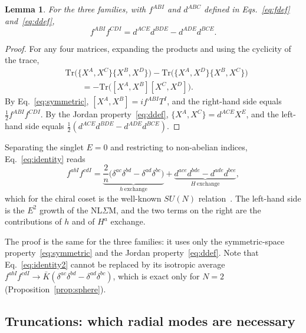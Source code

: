 \documentclass[aps,prd,twocolumn,superscriptaddress,nofootinbib,floatfix]{revtex4-2}
\newtheorem{lemma}{Lemma}
\theoremstyle{remark}
\newcommand{\Tr}{\mathrm{Tr}}
\begin{document}
\begin{lemma}
\label{lem:identity}
For the three families, with $f^{ABI}$ and $d^{ABC}$ defined in Eqs.~\eqref{eq:fdef} and~\eqref{eq:ddef},
\begin{equation}
f^{ABI}f^{CDI}=d^{ACE}d^{BDE}-d^{ADE}d^{BCE}.
\label{eq:identity}
\end{equation}
\end{lemma}
\begin{proof}
For any four matrices, expanding the products and using the cyclicity of the trace,
\begin{equation}
\begin{split}
&\Tr\big(\{X^A,X^C\}\{X^B,X^D\}\big)-\Tr\big(\{X^A,X^D\}\{X^B,X^C\}\big)\\
&\qquad=-\Tr\big([X^A,X^B][X^C,X^D]\big).
\end{split}
\label{eq:traceid}
\end{equation}
By Eq.~\eqref{eq:symmetric}, $[X^A,X^B]=if^{ABI}T^I$, and the right-hand side equals $\tfrac12f^{ABI}f^{CDI}$. By the Jordan property~\eqref{eq:ddef}, $\{X^A,X^C\}=d^{ACE}X^E$, and the left-hand side equals $\tfrac12(d^{ACE}d^{BDE}-d^{ADE}d^{BCE})$.
\end{proof}
Separating the singlet $E=0$ and restricting to non-abelian indices, Eq.~\eqref{eq:identity} reads
\begin{equation}
f^{abI}f^{cdI}=\underbrace{\frac{2}{n}\big(\delta^{ac}\delta^{bd}-\delta^{ad}\delta^{bc}\big)}_{h\ \text{exchange}}+\underbrace{d^{ace}d^{bde}-d^{ade}d^{bce}}_{H\ \text{exchange}} ,
\label{eq:identity2}
\end{equation}
which for the chiral coset is the well-known $SU(N)$ relation~\cite{Haber:2019sgz}. The left-hand side is the $E^2$ growth of the NL$\Sigma$M, and the two terms on the right are the contributions of $h$ and of $H^a$ exchange.

The proof is the same for the three families: it uses only the symmetric-space property~\eqref{eq:symmetric} and the Jordan property~\eqref{eq:ddef}. Note that Eq.~\eqref{eq:identity2} cannot be replaced by its isotropic average $f^{abI}f^{cdI}\to\bar K(\delta^{ac}\delta^{bd}-\delta^{ad}\delta^{bc})$, which is exact only for $N=2$ (Proposition~\ref{prop:sphere}).

\subsection{Truncations: which radial modes are necessary}
\end{document}
